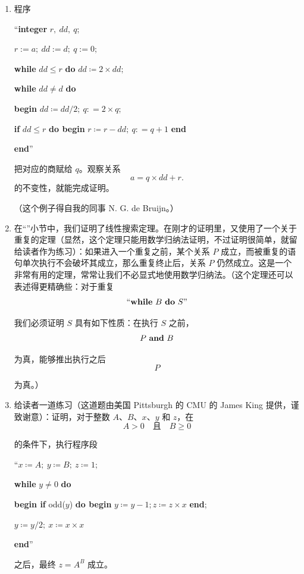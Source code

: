 \documentclass[twoside,11pt,fontset=none]{ctexbook}
\begin{document}
\begin{enumerate}[wide, nosep, label=\textit{说明 }\arabic*.]
	\item 程序
	
	{
		\setlength{\parindent}{8em}
		\hspace{-.4em}``\textbf{integer} $r,\ dd,\ q;$
		
		$r:= a;\ dd:= d;\ q:= 0;$
		
		\textbf{while} $dd \leqslant r$ \textbf{do} $dd \coloneq 2 \times dd;$
		
		\textbf{while} $dd \neq d$ \textbf{do}
		
		\quad\textbf{begin} $dd \coloneq dd/2;\ q: = 2 \times q;$
		
		\quad\quad\textbf{if} $dd \leqslant r$ \textbf{do begin} $r \coloneq r - dd;\ q: = q + 1$ \textbf{end}
		
		\quad\textbf{end}''
	}
	
\noindent
把对应的商赋给 $q$。观察关系
	$$
	a= q \times dd + r.
	$$
	的不变性，就能完成证明。
	
	（这个例子得自我的同事 N. G. de Bruijn。）

	\item 在“”小节中，我们证明了线性搜索定理。在刚才的证明里，又使用了一个关于重复的定理（显然，这个定理只能用数学归纳法证明，不过证明很简单，就留给读者作为练习）：如果进入一个重复之前，某个关系 $P$ 成立，而被重复的语句单次执行不会破坏其成立，那么重复终止后，关系 $P$ 仍然成立。这是一个非常有用的定理，常常让我们不必显式地使用数学归纳法。（这个定理还可以表述得更精确些：对于重复
	$$
		\text{``\textbf{while} } B \text{ \textbf{do} } S\text{''}
	$$
	
	\noindent
	我们必须证明 $S$ 具有如下性质：在执行 $S$ 之前，
	$$
	P \text{ \textbf{and} } B
	$$
	
	\noindent
	为真，能够推出执行之后
	$$ P $$
	
	\noindent
	为真。）
	\item 给读者一道练习（这道题由美国 Pittsburgh 的 CMU 的 James King 提供，谨致谢意）：证明，对于整数 $A$、$B$、$x$、$y$ 和 $z$，在
	$$
	A > 0\quad \text{且}\quad B\geqslant 0
	$$
	
	\noindent
	的条件下，执行程序段
	
	{
		\setlength{\parindent}{8em}
		\hspace{-.4em}``$x \coloneq A;\ y \coloneq B;\ z \coloneq 1;$
		
		\textbf{while} $y \neq 0$ \textbf{do}
		
		\quad\textbf{begin if} odd($y$) \textbf{do begin} $y \coloneq y - 1; z \coloneq z \times x$ \textbf{end};
		
		\quad\quad $y \coloneq y/2;\ x \coloneq x \times x$
		
		\quad\textbf{end}''
	}
	
	\noindent
	之后，最终 $z = A^B$ 成立。
\end{enumerate}
\end{document}
